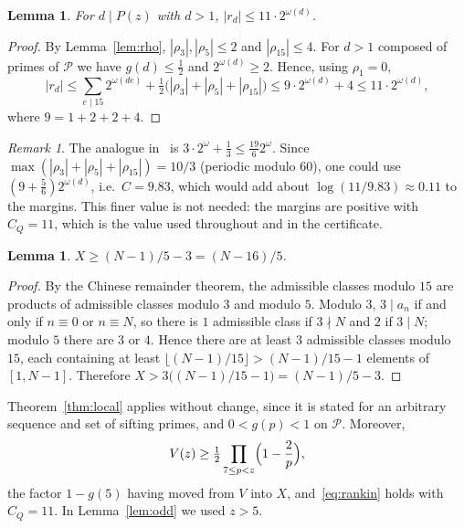 \documentclass[preprint,11pt]{elsarticle}
\newtheorem{lemma}[theorem]{Lemma}
\theoremstyle{definition}
\theoremstyle{remark}
\newtheorem{remark}[theorem]{Remark}
\newcommand{\cP}{\mathcal{P}}
\newcommand{\C}{\cite{Campbell2026}}
\numberwithin{equation}{section}
\begin{document}
\begin{lemma}\label{lem:CQ}
For $d\mid P(z)$ with $d>1$, $|r_d|\le 11\cdot2^{\omega(d)}$.
\end{lemma}

\begin{proof}
By Lemma~\ref{lem:rho}, $|\rho_3|,|\rho_5|\le2$ and $|\rho_{15}|\le4$. For
$d>1$ composed of primes of $\cP$ we have $g(d)\le\frac12$ and
$2^{\omega(d)}\ge2$. Hence, using $\rho_1=0$,
\[
  |r_d|\le\sum_{e\mid15}2^{\omega(de)}+\tfrac12\bigl(|\rho_3|+|\rho_5|+|\rho_{15}|\bigr)
  \le9\cdot2^{\omega(d)}+4\le11\cdot2^{\omega(d)},
\]
where $9=1+2+2+4$.
\end{proof}

\begin{remark}
The analogue in~\C{} is $3\cdot2^{\omega}+\frac13\le\frac{19}{6}2^{\omega}$.
Since $\max(|\rho_3|+|\rho_5|+|\rho_{15}|)=10/3$ (periodic modulo $60$),
one could use $(9+\frac56)2^{\omega(d)}$, i.e.\ $C=9.83$, which would add
about $\log(11/9.83)\approx0.11$ to the margins. This finer value is not
needed: the margins are positive with $C_Q=11$, which is the value used
throughout and in the certificate.
\end{remark}

\begin{lemma}\label{lem:X}
$X\ge(N-1)/5-3=(N-16)/5$.
\end{lemma}

\begin{proof}
By the Chinese remainder theorem, the admissible classes modulo $15$ are
products of admissible classes modulo $3$ and modulo $5$. Modulo $3$,
$3\mid a_n$ if and only if $n\equiv0$ or $n\equiv N$, so there is $1$
admissible class if $3\nmid N$ and $2$ if $3\mid N$; modulo $5$ there are
$3$ or $4$. Hence there are at least $3$ admissible classes modulo $15$,
each containing at least $\lfloor(N-1)/15\rfloor>(N-1)/15-1$ elements of
$[1,N-1]$. Therefore $X>3\bigl((N-1)/15-1\bigr)=(N-1)/5-3$.
\end{proof}

Theorem~\ref{thm:local} applies without change, since it is stated for an
arbitrary sequence and set of sifting primes, and $0<g(p)<1$ on $\cP$.
Moreover,
\begin{equation}\label{eq:V}
  V(z)\ge\tfrac12\prod_{7\le p<z}\Bigl(1-\frac2p\Bigr),
\end{equation}
the factor $1-g(5)$ having moved from $V$ into $X$, and~\eqref{eq:rankin}
holds with $C_Q=11$. In Lemma~\ref{lem:odd} we used $z>5$.
\end{document}

